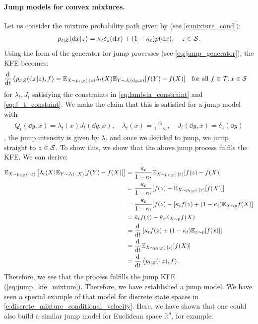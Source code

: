 \documentclass{fairmeta}
\numberwithin{equation}{section}
\begin{document}
\paragraph{Jump models for convex mixtures.} Let us consider the mixture probability path given by (see \cref{e:mixture_cond}):
\begin{align}
\label{eq:mixture_path_example}
    p_{t|Z}(\mathrm{d} x|z)=\kappa_t\delta_{z}(\mathrm{d} x)+(1-\kappa_t)p(\mathrm{d} x),\quad z\in{\mathcal{S}}.
\end{align}
Using the form of the generator for jump processes (see \cref{eq:jump_generator}), the KFE becomes:
\begin{align}
\label{eq:jump_kfe_mixture}
\frac{\mathrm{d}}{\mathrm{d} t} \left \langle p_{t|Z}(\mathrm{d} x|z), f\right \rangle &= \mathbb{E}_{X\sim p_{t|Z}(\cdot|z)}\lambda_t(X)\mathbb{E}_{Y\sim J_t(\mathrm{d} y,x)}[f(Y)-f(X)]\quad\text{for all }f\in{\mathcal{T}},x\in{\mathcal{S}}
\end{align}
for $\lambda_t,J_t$ satisfying the constraints in \cref{eq:lambda_constraint} and \cref{eq:J_t_constaint}. We make the claim that this is satisfied for a jump model with 
\begin{align*}
Q_t(\dd y,x)=\lambda_t(x)J_t(\dd y,x),\quad\lambda_t(x) = \frac{\dot{\kappa}_t}{1-\kappa_t},\quad J_t(\dd y,x)=\delta_{z}(\dd y)
\end{align*}
\ie, the jump intensity is given by $\lambda_t$ and once we decided to jump, we jump straight to $z\in{\mathcal{S}}$. To show this, we show that the above jump process fulfils the KFE. We can derive:
\begin{align*}
\mathbb{E}_{X\sim p_{t|Z}(\cdot|z)}\left [\lambda_t(X)\mathbb{E}_{Y\sim J_t(\cdot,X)}[f(Y)-f(X)]\right ]
&=\frac{\dot{\kappa}_t}{1-\kappa_t}\mathbb{E}_{X\sim p_{t|Z}(\cdot|z)}[f(z)-f(X)]\\
&=\frac{\dot{\kappa}_t}{1-\kappa_t}[f(z)-\mathbb{E}_{X\sim p_{t|Z}(\cdot|z)}[f(X)]]\\
&=\frac{\dot{\kappa}_t}{1-\kappa_t}[f(z)-[\kappa_tf(z) + (1-\kappa_t)\mathbb{E}_{X\sim p}f(X)]\\
&=\dot{\kappa}_tf(z)-\dot{\kappa}_t\mathbb{E}_{X\sim p}f(X)\\
&=\frac{\mathrm{d}}{\mathrm{d} t}\left[\kappa_tf(z)+(1-\kappa_t)\mathbb{E}_{x\sim p}[f(x)]\right]\\
&=\frac{\mathrm{d}}{\mathrm{d} t}\mathbb{E}_{X\sim p_{t|Z}(\cdot|z)}[f(X)]\\
&=\frac{\mathrm{d}}{\mathrm{d} t}\left \langle p_{t|Z}(\cdot|z), f\right \rangle.
\end{align*}
Therefore, we see that the process fulfills the jump KFE (\cref{eq:jump_kfe_mixture}). Therefore, we have established a jump model. We have seen a special example of that model for discrete state spaces in \cref{e:discrete_mixture_conditional_velocity}. Here, we have shown that one could also build a similar jump model for Euclidean space $\mathbb{R}^d$, for example.
\end{document}
